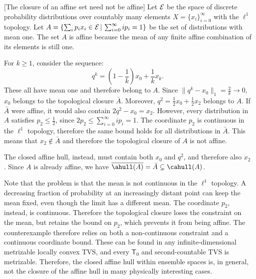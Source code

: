 \begin{mathSection}
\begin{example}\label{pm-es-closureAffineCounterexample}[The closure of an affine set need not be affine]
	Let $\mathcal{E}$ be the space of discrete probability distributions over countably many elements $X = \{x_i\}_{i=0}^{\infty}$ with the $\ell^1$ topology. Let $A = \{ \sum_i p_i x_i \in \mathcal{E} \, | \, \sum_{i=0}^{\infty} i p_i = 1 \}$ be the set of distributions with mean one. The set $A$ is affine because the mean of any finite affine combination of its elements is still one.
	
	For $k \geq 1$, consider the sequence:
	$$q^{k} = \left(1-\frac{1}{k}\right)x_0 + \frac{1}{k}x_{k}.$$
	These all have mean one and therefore belong to $A$. Since $\|q^{k}-x_0\|_1 = \frac{2}{k} \to 0$, $x_0$ belongs to the topological closure $\bar{A}$. Moreover, $q^{2} = \frac{1}{2}x_0 + \frac{1}{2}x_2$ belongs to $A$. If $\bar{A}$ were affine, it would also contain $2q^{2}-x_0 = x_2$.
	However, every distribution in $A$ satisfies $p_2 \leq \frac{1}{2}$, since $2p_2 \leq \sum_{i=0}^{\infty} i p_i = 1$. The coordinate $p_2$ is continuous in the $\ell^1$ topology, therefore the same bound holds for all distributions in $\bar{A}$. This means that $x_2 \notin \bar{A}$ and therefore the topological closure of $A$ is not affine.
	
	The closed affine hull, instead, must contain both $x_0$ and $q^{2}$, and therefore also $x_2$. Since $A$ is already affine, we have $\overline{\ahull(A)} = \bar{A} \subsetneq \cahull(A)$.
\end{example}

\begin{remark}
	Note that the problem is that the mean is not continuous in the $\ell^1$ topology. A decreasing fraction of probability at an increasingly distant point can keep the mean fixed, even though the limit has a different mean. The coordinate $p_2$, instead, is continuous. Therefore the topological closure loses the constraint on the mean, but retains the bound on $p_2$, which prevents it from being affine. The counterexample therefore relies on both a non-continuous constraint and a continuous coordinate bound. These can be found in any infinite-dimensional metrizable locally convex TVS, and every $\mathsf{T}_0$ and second-countable TVS is metrizable. Therefore, the closed affine hull within ensemble spaces is, in general, not the closure of the affine hull in many physically interesting cases.
\end{remark}
\end{mathSection}

